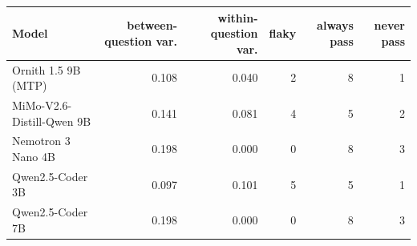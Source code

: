 \begin{tabular}{lrrrrr}\toprule Model & between-question var. & within-question var. & flaky & always pass & never pass\\\midrule
Ornith 1.5 9B (MTP) & 0.108 & 0.040 & 2 & 8 & 1 \\
MiMo-V2.6-Distill-Qwen 9B & 0.141 & 0.081 & 4 & 5 & 2 \\
Nemotron 3 Nano 4B & 0.198 & 0.000 & 0 & 8 & 3 \\
Qwen2.5-Coder 3B & 0.097 & 0.101 & 5 & 5 & 1 \\
Qwen2.5-Coder 7B & 0.198 & 0.000 & 0 & 8 & 3 \\
\bottomrule\end{tabular}
